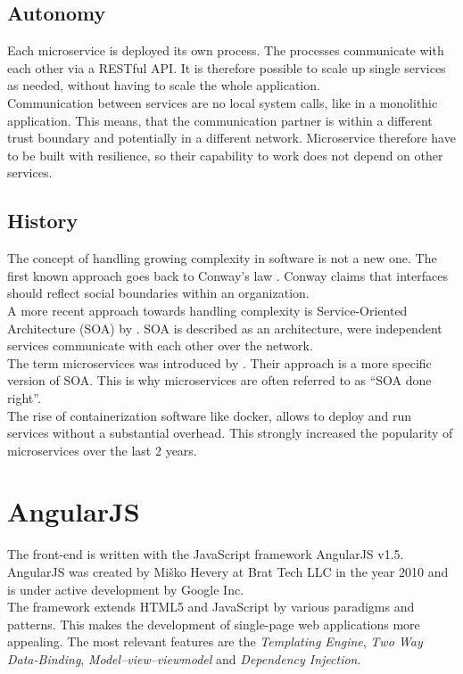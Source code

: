 \subsection{Autonomy}
Each microservice is deployed its own process. The processes communicate with each other via a RESTful API. It is therefore possible to scale up single services as needed, without having to scale the whole application.\\
Communication between services are no local system calls, like in a monolithic application. This means, that the communication partner is within a different trust boundary and potentially in a different network. Microservice therefore have to be built with resilience, so their capability to work does not depend on other services.


\subsection{History}
The concept of handling growing complexity in software is not a new one. The first known approach goes back to Conway's law \cite{conway1968committees}. Conway claims that interfaces should reflect social boundaries within an organization.\\
A more recent approach towards handling complexity is Service-Oriented Architecture (SOA) by \cite{as2005service}. SOA is described as an architecture, were independent services communicate with each other over the network.\\
The term microservices was introduced by \cite{martinfowler2014microservices}. Their approach is a more specific version of SOA. This is why microservices are often referred to as \enquote{SOA done right}.\\
The rise of containerization software like docker, allows to deploy and run services without a substantial overhead. This strongly increased the popularity of microservices over the last 2 years.



\section{AngularJS}
\label{sec:angularjs}
The front-end is written with the JavaScript framework AngularJS v1.5. AngularJS was created by Miško Hevery at Brat Tech LLC in the year 2010 and is under active development by Google Inc. \\
The framework extends HTML5 and JavaScript by various paradigms and patterns. This makes the development of single-page web applications more appealing. The most relevant features are the \textit{Templating Engine}, \textit{Two Way Data-Binding}, \textit{Model–view–viewmodel} and \textit{Dependency Injection}.


